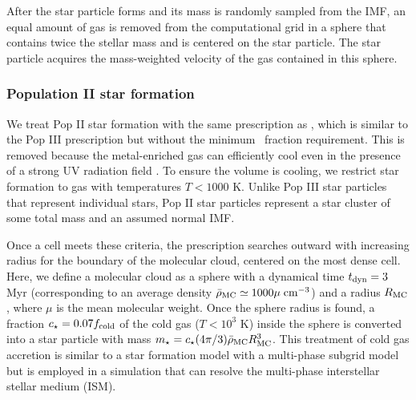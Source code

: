 \documentclass[12pt,preprint]{aastex}
\begin{document}
After the star particle forms and its mass is randomly sampled from
the IMF, an equal amount of gas is removed from the computational grid
in a sphere that contains twice the stellar mass and is centered on
the star particle.  The star particle acquires the mass-weighted
velocity of the gas contained in this sphere.

%

\subsubsection{Population II star formation}

We treat Pop II star formation with the same prescription as
\citet{Wise09}, which is similar to the Pop III prescription but
without the minimum \hh~fraction requirement.  This is removed because
the metal-enriched gas can efficiently cool even in the presence of a
strong UV radiation field \citep[e.g.][]{Safranek10}.  To ensure the
volume is cooling, we restrict star formation to gas with temperatures
$T < 1000$ K.  Unlike Pop III star particles that represent individual
stars, Pop II star particles represent a star cluster of some total
mass and an assumed normal IMF.

Once a cell meets these criteria, the prescription searches outward
with increasing radius for the boundary of the molecular cloud,
centered on the most dense cell.  Here, we define a molecular cloud as
a sphere with a dynamical time $t_{\rm dyn} = 3$ Myr (corresponding to
an average density $\bar{\rho}_{\rm MC} \simeq 1000\mu\; \cubecm$) and
a radius $R_{\rm MC}$, where $\mu$ is the mean molecular weight.  Once
the sphere radius is found, a fraction $c_\star = 0.07 f_{\rm cold}$
of the cold gas ($T < 10^3$ K) inside the sphere is converted into a
star particle with mass $m_\star = c_\star (4\pi/3) \bar{\rho}_{\rm
  MC} R_{\rm MC}^3$.  This treatment of cold gas accretion is similar
to a star formation model with a multi-phase subgrid model
\citep{Springel03b} but is employed in a simulation that can resolve
the multi-phase interstellar stellar medium (ISM).
\end{document}
